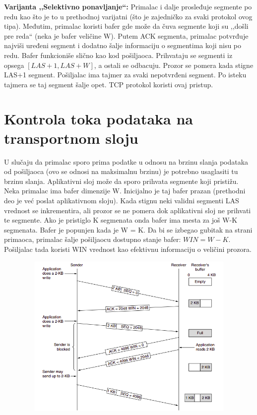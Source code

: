 \documentclass[a4paper]{article}
\begin{document}
        \textbf{Varijanta ,,Selektivno ponavljanje``:} Primalac i dalje prosleđuje 
        segmente po redu kao što je to u prethodnoj varijatni (što je zajedničko za svaki 
        protokol ovog tipa). Međutim, primalac koristi bafer gde može da čuva segmente
        koji su ,,došli pre reda`` (neka je bafer veličine W). Putem ACK segmenta, primalac
        potvrđuje najviši uređeni segment i dodatno šalje informaciju o segmentima koji nisu po redu.
        Bafer funkcioniše slično kao kod pošiljaoca. Prihvataju se segmenti iz
        opsega $[LAS+1, LAS+W]$, a ostali se odbacuju. Prozor se pomera kada stigne LAS+1 segment. 
        Pošiljalac ima tajmer za svaki nepotvrđeni segment. Po isteku tajmera se taj segment šalje opet.
        TCP protokol koristi ovaj pristup. 

\section{Kontrola toka podataka na transportnom sloju}
    U slučaju da primalac sporo prima podatke u odnosu na brzinu slanja podataka od pošiljaoca (ovo 
    se odnosi na maksimalnu brzinu) je potrebno usaglasiti tu brzinu slanja. Aplikativni sloj može da
    sporo prihvata segmente koji pristižu. \\
    \indent Neka primalac ima bafer dimenzije W. Inicijalno je taj bafer prazan (prethodni deo
    je već poslat aplikativnom sloju). Kada stignu neki validni segmenti LAS vrednost se inkrementira,
    ali prozor se ne pomera dok aplikativni sloj ne prihvati te segmente. Ako je pristiglo K
    segmenata onda bafer ima mesta za još W-K segmenata. Bafer je popunjen kada je W = K. Da bi se
    izbegao gubitak na strani primaoca, primalac šalje pošiljaocu dostupno stanje bafer: 
    $WIN = W - K$. Pošiljalac tada koristi WIN vrednost kao efektivnu informaciju o veličini prozora.
    \begin{figure}[H]
        \begin{center}
            \includegraphics[width=120mm,height=80mm]{Slike/kontrola_toka.png}
        \end{center}
    \end{figure}
\end{document}
